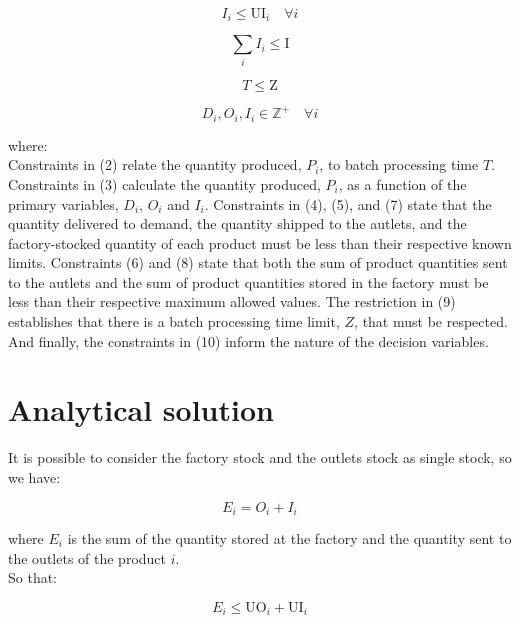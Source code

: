 \documentclass[preprint,12pt,authoryear]{elsarticle}
\begin{document}
\begin{equation}
I_i \leq \textrm{UI}_i \quad \forall i
\end{equation}

\begin{equation}
\sum_i{I_i} \leq \textrm{I}
\end{equation}

\begin{equation}
T \leq \textrm{Z}
\end{equation}

\begin{equation}
D_i, O_i, I_i \in  \mathbb{Z}^+ \quad \forall i
\end{equation}

where: \\

Constraints in (2) relate the quantity produced, $P_i$, to batch processing time $T$. Constraints in (3) calculate the quantity produced, $P_i$, as a function of the primary variables, $D_i$, $O_i$ and $I_i$. Constraints in (4), (5), and (7) state that the quantity delivered to demand, the quantity shipped to the autlets, and the factory-stocked quantity of each product must be less than their respective known limits. Constraints (6) and (8) state that both the sum of product quantities sent to the autlets and the sum of product quantities stored in the factory must be less than their respective maximum allowed values. The restriction in (9) establishes that there is a batch processing time limit, $Z$, that must be respected. And finally, the constraints in (10) inform the nature of the decision variables.

\section{Analytical solution}
\label{}

It is possible to consider the factory stock and the outlets stock as single stock, so we have:

\begin{equation}
E_i = O_i + I_i
\end{equation}

where $E_i$ is the sum of the quantity stored at the factory and the quantity sent to the outlets of the product $i$. \\

So that:

\begin{equation}
E_i \leq \textrm{UO}_i + \textrm{UI}_i
\end{equation}
\end{document}
